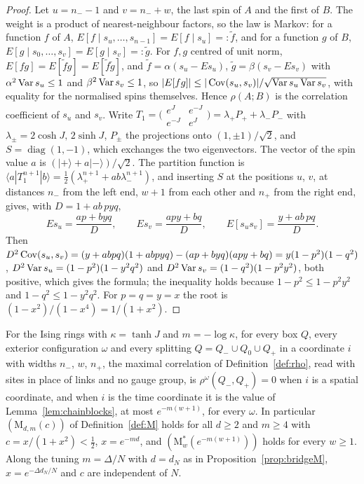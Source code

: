 \begin{proof}
Let $u=n_--1$ and $v=n_-+w$, the last spin of $A$ and the first of $B$. The
weight is a product of nearest-neighbour factors, so the law is Markov:
for a function $f$ of $A$, $E[f\mid s_u,\dots,s_{n-1}]=E[f\mid s_u]=:\tilde
f$, and for a function $g$ of $B$, $E[g\mid s_0,\dots,s_v]=E[g\mid
s_v]=:\tilde g$. For $f,g$ centred of unit norm, $E[fg]=E[\tilde fg]=
E[\tilde f\tilde g]$, and $\tilde f=\alpha(s_u-Es_u)$, $\tilde g=\beta(s_v-
Es_v)$ with $\alpha^2\operatorname{Var} s_u\le1$ and $\beta^2\operatorname{Var} s_v\le1$, so
$|E[fg]|\le|\operatorname{Cov}(s_u,s_v)|/\sqrt{\operatorname{Var} s_u\operatorname{Var} s_v}$, with equality for the
normalised spins themselves. Hence $\rho(A;B)$ is the correlation
coefficient of $s_u$ and $s_v$. Write $T_1=\bigl(\begin{smallmatrix}e^J&
e^{-J}\\e^{-J}&e^J\end{smallmatrix}\bigr)=\lambda_+P_++\lambda_-P_-$ with
$\lambda_\pm=2\cosh J,\,2\sinh J$, $P_\pm$ the projections onto $(1,\pm1)/
\sqrt2$, and $S=\operatorname{diag}(1,-1)$, which exchanges the two
eigenvectors. The vector of the spin value $a$ is $(|{+}\rangle+a|{-}\rangle)/
\sqrt2$. The partition function is $\langle a|T_1^{n+1}|b\rangle=\frac12
(\lambda_+^{n+1}+ab\lambda_-^{n+1})$, and inserting $S$ at the positions
$u$, $v$, at distances $n_-$ from the left end, $w+1$ from each other and
$n_+$ from the right end, gives, with $D=1+ab\,pyq$,
\[
Es_u=\frac{ap+byq}{D},\qquad Es_v=\frac{apy+bq}{D},\qquad
E[s_us_v]=\frac{y+ab\,pq}{D}.
\]
Then $D^2\operatorname{Cov}(s_u,s_v)=(y+abpq)(1+abpyq)-(ap+byq)(apy+bq)=y(1-p^2)(1-q^2)$,
$D^2\operatorname{Var} s_u=(1-p^2)(1-y^2q^2)$ and $D^2\operatorname{Var} s_v=(1-q^2)(1-p^2y^2)$, both
positive, which gives the formula; the inequality holds because $1-p^2\le
1-p^2y^2$ and $1-q^2\le1-y^2q^2$. For $p=q=y=x$ the root is
$(1-x^2)/(1-x^4)=1/(1+x^2)$.
\end{proof}

\begin{proposition}\label{prop:ringsM}
For the Ising rings with $\kappa=\tanh J$ and $m=-\log\kappa$, for every box
$Q$, every exterior configuration $\omega$ and every splitting $Q=Q_-\cup
Q_0\cup Q_+$ in a coordinate $i$ with widths $n_-$, $w$, $n_+$, the maximal
correlation of Definition~\textup{\ref{def:rho}}, read with sites in place of
links and no gauge group, is $\rho^\omega(Q_-,Q_+)=0$ when $i$ is a spatial
coordinate, and when $i$ is the time coordinate it is the value of
Lemma~\textup{\ref{lem:chainblocks}}, at most $e^{-m(w+1)}$, for every
$\omega$. In particular $(\mathrm M_{d,m}(c))$ of
Definition~\textup{\ref{def:M}} holds for all $d\ge2$ and $m\ge4$ with
$c=x/(1+x^2)<\frac12$, $x=e^{-md}$, and $(\mathrm M^*_w(e^{-m(w+1)}))$ holds
for every $w\ge1$. Along the tuning $m=\Delta/N$ with $d=d_N$ as in
Proposition~\textup{\ref{prop:bridgeM}}, $x=e^{-\Delta d_N/N}$ and $c$ are
independent of $N$.
\end{proposition}

